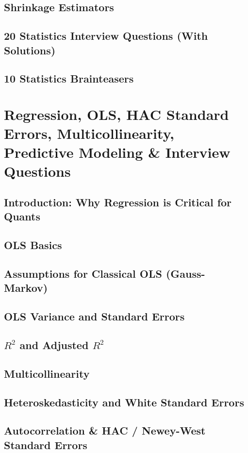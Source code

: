 \documentclass{report}
\begin{document}
\subsection*{Shrinkage Estimators}
\subsection*{20 Statistics Interview Questions (With Solutions)}
\subsection*{10 Statistics Brainteasers}

\section{Regression, OLS, HAC Standard Errors, Multicollinearity, Predictive Modeling \& Interview Questions}
\subsection*{Introduction: Why Regression is Critical for Quants}
\subsection*{OLS Basics}
\subsection*{Assumptions for Classical OLS (Gauss-Markov)}
\subsection*{OLS Variance and Standard Errors}
\subsection*{$R^2$ and Adjusted $R^2$}
\subsection*{Multicollinearity}
\subsection*{Heteroskedasticity and White Standard Errors}
\subsection*{Autocorrelation \& HAC / Newey-West Standard Errors}
\end{document}
